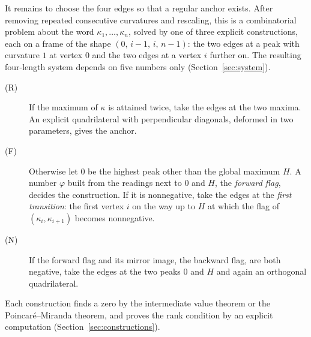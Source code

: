 It remains to choose the four edges so that a regular anchor exists. After
removing repeated consecutive curvatures and rescaling, this is a
combinatorial problem about the word $\kappa_1,\dots,\kappa_n$, solved by one
of three explicit constructions, each on a frame of the shape
$(0,\allowbreak\,i-1,\allowbreak\,i,\allowbreak\,n-1)$: the two edges at a peak with curvature $1$ at vertex
$0$ and the two edges at a vertex $i$ further on. The resulting four-length
system depends on five numbers only (Section~\ref{sec:system}).
\begin{description}
\item[(R)] If the maximum of $\kappa$ is attained twice, take the edges at
  the two maxima. An explicit quadrilateral with perpendicular diagonals,
  deformed in two parameters, gives the anchor.
\item[(F)] Otherwise let $0$ be the highest peak other than the global
  maximum $H$. A number $\varphi$ built from the readings next to $0$ and $H$,
  the \emph{forward flag}, decides the construction. If it is nonnegative,
  take the edges at the \emph{first transition}: the first vertex $i$ on the
  way up to $H$ at which the flag of $(\kappa_{i},\kappa_{i+1})$ becomes
  nonnegative.
\item[(N)] If the forward flag and its mirror image, the backward flag, are
  both negative, take the edges at the two peaks $0$ and $H$ and again an
  orthogonal quadrilateral.
\end{description}
Each construction finds a zero by the intermediate value theorem or the
Poincar\'e--Miranda theorem, and proves the rank condition by an explicit
computation (Section~\ref{sec:constructions}).
